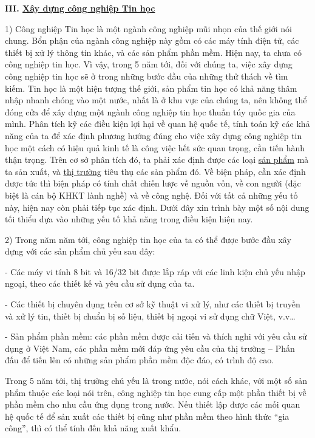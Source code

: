 \documentclass[11pt, a4paper, reqno, oneside]{book}
\begin{document}
\newpage


\textbf{III.	 \underline{ Xây dựng công nghiệp Tin học}}

1)	Công nghiệp Tin học là một ngành công nghiệp mũi nhọn của thế giới nói chung. Bổn phận của ngành công nghiệp này gồm có các máy tính điện tử, các thiết bị xử lý thông tin khác, và các sản phẩm phần mềm. Hiện nay, ta chưa có công nghiệp tin học. Vì vậy, trong 5 năm tới, đối với chúng ta, việc xây dựng công nghiệp tin học sẽ ở trong những bước đầu của những thử thách về tìm kiếm. Tin học là một hiện tượng thế giới, sản phẩm tin học có khả năng thâm nhập nhanh chóng vào một nước, nhất là ở khu vực của chúng ta, nên không thể đóng cửa để xây dựng một ngành công nghiệp tin học thuần túy quốc gia của mình. Phân tích kỹ các điều kiện lợi hại về quan hệ quốc tế, tính toán kỹ các khả năng của ta để xác định phương hướng đúng cho việc xây dựng công nghiệp tin học một cách có hiệu quả kinh tế là công việc hết sức quan trọng, cần tiến hành thận trọng. Trên cơ sở phân tích đó, ta phải xác định được các loại \underline{ sản phẩm} mà ta sản xuất, và \underline{ thị trường} tiêu thụ các sản phẩm đó. Về biện pháp, cần xác định được tức thì biện pháp có tính chất chiến lược về nguồn vốn, về con người (đặc biệt là cán bộ KHKT lành nghề) và về công nghệ. Đối với tất cả những yếu tố này, hiện nay còn phải tiếp tục xác định. Dưới đây xin trình bày một số nội dung tối thiểu dựa vào những yếu tố khả năng trong điều kiện hiện nay.


2)	Trong năm năm tới, công nghiệp tin học của ta có thể được bước đầu xây dựng với các sản phẩm chủ yếu sau đây:


-	Các máy vi tính 8 bit và 16/32 bit được lắp ráp với các linh kiện chủ yếu nhập ngoại, theo các thiết kế và yêu cầu sử dụng của ta.


-	Các thiết bị chuyên dụng trên cơ sở kỹ thuật vi xử lý, như các thiết bị truyền và xử lý tin, thiết bị chuẩn bị số liệu, thiết bị ngoại vi sử dụng chữ Việt, v.v…


-	Sản phẩm phần mềm: các phần mềm được cải tiến và thích nghi với yêu cầu sử dụng ở Việt Nam, các phần mềm mới đáp ứng yêu cầu của thị trường – Phấn đấu để tiến lên có những sản phẩm phần mềm độc đáo, có trình độ cao.


Trong 5 năm tới, thị trường chủ yếu là trong nước, nói cách khác, với một số sản phẩm thuộc các loại nói trên, công nghiệp tin học cung cấp một phần thiết bị về phần mềm cho nhu cầu ứng dụng trong nước. Nếu thiết lập được các mối quan hệ quốc tế để sản xuất các thiết bị cũng như phần mềm theo hình thức “gia công”, thì có thể tính đến khả năng xuất khẩu.
\end{document}
